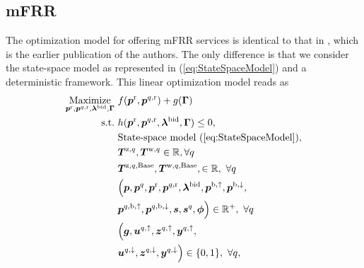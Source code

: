 \documentclass[conference]{IEEEtran}
\begin{document}
\subsection{mFRR}

The optimization model for offering mFRR services is identical to that in \cite{gade2023load}, which is the earlier publication of the authors. The only difference is that we consider the state-space model as represented in  (\ref{eq:StateSpaceModel}) and a deterministic framework. This linear optimization model reads as
%
%
\begin{subequations}\label{P1:compact_model_mfrr}
    \begin{align}
        \underset{\bm{p}^{\rm{r}}, \bm{p}^{q,\rm{r}}, \bm{\lambda}^{\rm{bid}}, \bm{\Gamma}}{\text{Maximize}} \  & f(\bm{p}^{\rm{r}}, \bm{p}^{q,\rm{r}}) + g(\bm{\Gamma}) \label{P1:eq1_mfrr}
        \\
        \text{s.t.} \                                                                                           & h(\bm{p}^{\rm{r}}, \bm{p}^{q,\rm{r}}, \bm{\lambda}^{\rm{bid}}, \bm{\Gamma}) \leq 0, \label{P1:eq2_mfrr}                                              \\
        \                                                                                                       & \text{State-space model } (\ref{eq:StateSpaceModel}),  \label{P1:eq3_mfrr}
        \\
        \                                                                                                       & \bm{T}^{\text{z},q}, \bm{T}^{\text{w},q} \in \mathbb{R}, \forall{q} \label{P1:eq4_mfrr}
        \\
        \                                                                                                       & \bm{T}^{\text{z},q,\text{Base}}, \bm{T}^{\text{w},q,\text{Base}}, \in \mathbb{R}, \ \forall{q} \label{P1:eq5_mfrr}
        \\
        \                                                                                                       & \Bigl( \bm{p}, \bm{p}^{q}, \bm{p}^{\rm{r}}, \bm{p}^{q,\rm{r}}, \bm{\lambda}^{\rm{bid}}, \bm{p}^{\rm{b},\uparrow}, \bm{p}^{\rm{b},\downarrow}, \notag \\ & \bm{p}^{q,\rm{b},\uparrow}, \bm{p}^{q,\rm{b},\downarrow}, \bm{s}, \bm{s}^{q}, \bm{\phi} \Bigr) \in \mathbb{R}^{+}, \ \forall{q}  \label{P1:eq6_mfrr}
        \\
        \                                                                                                       & \Bigl( \bm{g}, \bm{u}^{q,\uparrow}, \bm{z}^{q,\uparrow}, \bm{y}^{q,\uparrow}, \notag                                                                 \\ & \bm{u}^{q,\downarrow}, \bm{z}^{q,\downarrow}, \bm{y}^{q,\downarrow} \Bigr) \in \{0,1\}, \ \forall{q}, \label{P1:eq7_mfrr}
    \end{align}
\end{subequations}
\end{document}
